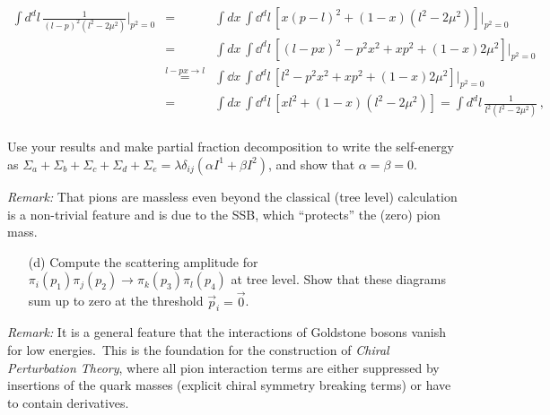 \documentclass[11pt]{latex/exercise}
\begin{document}
\begin{itemize}
          \begin{eqnarray}
              \int d^d l\,\frac{1}{(l-p)^2\left(l^2-2\mu^2\right)}|_{p^2=0}
              \!\!\!&=&\!\!\!
              \int d x\, \int \dd^d l\, \left[x(p-l)^2+(1-x)(l^2-2\mu^2)\right]|_{p^2=0}
              \nonumber
              \\
              \!\!\!&=&\!\!\!
              \int d x\, \int \dd^d l\, \left[(l-px)^2-p^2x^2+xp^2+(1-x)2\mu^2\right]\big\vert_{p^2=0}
              \nonumber
              \\
              \!\!\!&\overset{l-px\rightarrow l}{=}&\!\!\!
              \int \dd x\, \int \dd^d l\, \left[l^2-p^2x^2+xp^2+(1-x)2\mu^2\right]|_{p^2=0}
              \nonumber
              \\
              \!\!\!&=&\!\!\!
              \int d x\, \int \dd^d l\, \left[xl^2+(1-x)(l^2-2\mu^2)\right]=\int d^d l\,\frac{1}{l^2\left(l^2-2\mu^2\right)}
              \,,
              \nonumber
              \\
          \end{eqnarray}

Use your results and make partial fraction decomposition to write the self-energy as $\Sigma_{a}+\Sigma_{b}+\Sigma_{c}+\Sigma_{d}+\Sigma_{e} = \lambda \delta_{i j} \left(  \alpha I^1 + \beta I^2 \right)$, and show that $\alpha = \beta = 0$.
\end{itemize}
\emph{Remark:} That pions are massless even beyond the classical (tree level) calculation is a non-trivial feature and is due to the SSB, which ``protects'' the (zero) pion mass.

\begin{itemize}
    \item[(d)] Compute the scattering amplitude for
          $\pi_i(p_1) \pi_j(p_2) \rightarrow \pi_k(p_3) \pi_l(p_4)$
          at tree level.
          Show that these diagrams sum up to zero at the threshold $\vec{p}_i=\vec{0}$.
\end{itemize}
\emph{Remark:} It is a general feature that the interactions of Goldstone bosons vanish for low energies.~This is the foundation for the construction of \emph{Chiral Perturbation Theory}, where all pion interaction terms are either suppressed by insertions of the quark masses (explicit chiral symmetry breaking terms) or have to contain derivatives.
\end{document}
